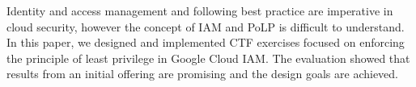 Identity and access management and following best practice are imperative in cloud security, however the concept of IAM and PoLP is difficult to understand. In this paper, we designed and implemented CTF exercises focused on enforcing the principle of least privilege in Google Cloud IAM. The evaluation showed that results from an initial offering are promising and the design goals are achieved. 